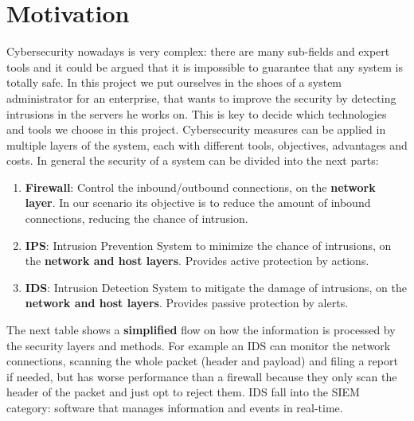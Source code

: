 

\section{Motivation}

Cybersecurity nowadays is very complex: there are many sub-fields and expert tools and it could be argued that it is impossible to guarantee that any system is totally safe.
In this project we put ourselves in the shoes of a system administrator for an enterprise, that wants to improve the security by detecting intrusions in the servers he works on. This is key to decide which technologies and tools we choose in this project.
\linej
\linej
Cybersecurity measures can be applied in multiple layers of the system, each with different tools, objectives, advantages and costs.
In general the security of a system can be divided into the next parts:
\begin{enumerate}
	\item \textbf{Firewall}: Control the inbound/outbound connections, on the \textbf{network layer}. In our scenario its objective is to reduce the amount of inbound connections, reducing the chance of intrusion.
	\item \textbf{IPS}: Intrusion Prevention System to minimize the chance of intrusions, on the \textbf{network and host layers}. Provides active protection by actions.
	\item \textbf{IDS}: Intrusion Detection System to mitigate the damage of intrusions, on the \textbf{network and host layers}. Provides passive protection by alerts.
\end{enumerate}

\linej
The next table shows a \textbf{simplified} flow on how the information is processed by the security layers and methods.
For example an IDS can monitor the network connections, scanning the whole packet (header and payload) and filing a report if needed, but has worse performance than a firewall because they only scan the header of the packet and just opt to reject them\cite{firewall-ipds-ids_comparison}.
IDS fall into the SIEM category: software that manages information and events in real-time.

